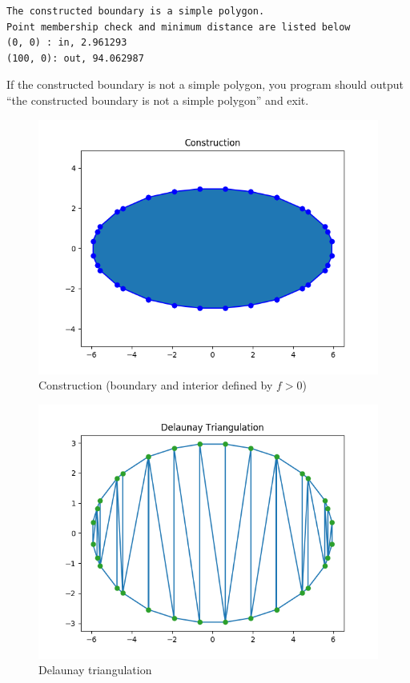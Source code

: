 \documentclass[11pt]{article}
\begin{document}
\begin{enumerate}
\begin{lstlisting}
The constructed boundary is a simple polygon.
Point membership check and minimum distance are listed below
(0, 0) : in, 2.961293
(100, 0): out, 94.062987
\end{lstlisting}
If the constructed boundary is not a simple polygon, you program should output ``the constructed boundary is not a simple polygon'' and exit.
\begin{figure}[H]
  \centering
  \includegraphics[scale=0.4]{construction.png}
  \caption{Construction (boundary and interior defined by $f > 0$)}
  \label{fig:construction}
\end{figure}

\begin{figure}[H]
  \centering
  \includegraphics[scale=0.4]{delaunay_triangulation.png}
  \caption{Delaunay triangulation}
  \label{fig:triangulation}
\end{figure}


\end{enumerate}
\end{document}
